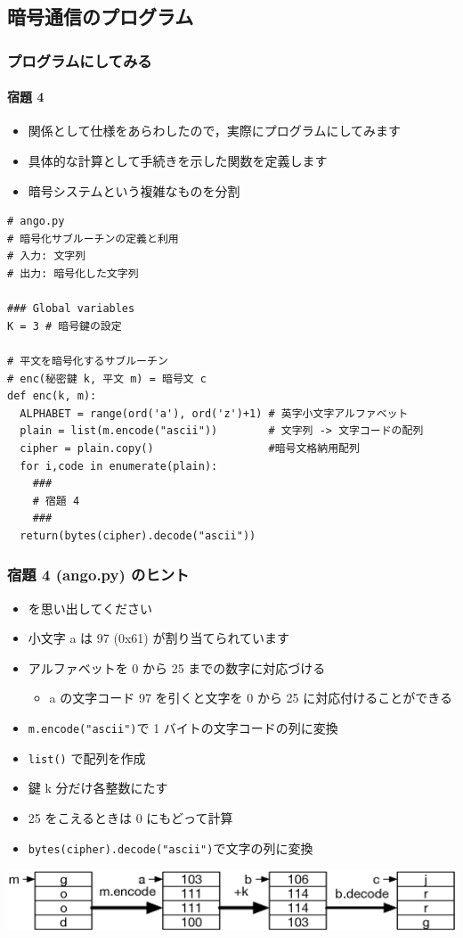 \subsection{暗号通信のプログラム}
\begin{frame}
\frametitle{プログラムにしてみる}
\framesubtitle{宿題 4}
  \begin{itemize}
\item 関係として仕様をあらわしたので，実際にプログラムにしてみます
\item 具体的な計算として手続きを示した関数を定義します
\item 暗号システムという複雑なものを分割
  \end{itemize}
  \begin{lstlisting}[caption={ango.py},label=lst:ango]
# ango.py
# 暗号化サブルーチンの定義と利用
# 入力: 文字列
# 出力: 暗号化した文字列

### Global variables
K = 3 # 暗号鍵の設定

# 平文を暗号化するサブルーチン
# enc(秘密鍵 k, 平文 m) = 暗号文 c
def enc(k, m):
  ALPHABET = range(ord('a'), ord('z')+1) # 英字小文字アルファベット
  plain = list(m.encode("ascii"))        # 文字列 -> 文字コードの配列
  cipher = plain.copy()                  #暗号文格納用配列
  for i,code in enumerate(plain):
    ###
    # 宿題 4
    ###
  return(bytes(cipher).decode("ascii"))
  \end{lstlisting}
\end{frame}
\begin{frame}
\frametitle{宿題 4 (ango.py) のヒント}
  \begin{itemize}
\item \href{https://en.wikipedia.org/wiki/ASCII\#/media/File:US-ASCII\_code\_chart.png}{} を思い出してください
\item 小文字 a は 97 (0x61) が割り当てられています
\item アルファベットを 0 から 25 までの数字に対応づける
    \begin{itemize}
\item a の文字コード 97 を引くと文字を 0 から 25 に対応付けることができる
    \end{itemize}
\item {\tt m.encode("ascii")}で 1 バイトの文字コードの列に変換
\item {\tt list()} で配列を作成
\item 鍵 k 分だけ各整数にたす
\item 25 をこえるときは 0 にもどって計算
\item {\tt bytes(cipher).decode("ascii")}で文字の列に変換
  \end{itemize}
  \begin{center}
\includegraphics[scale=0.5]{./Figure/elementaryCS-figAngo.eps}
  \end{center}
\end{frame}
